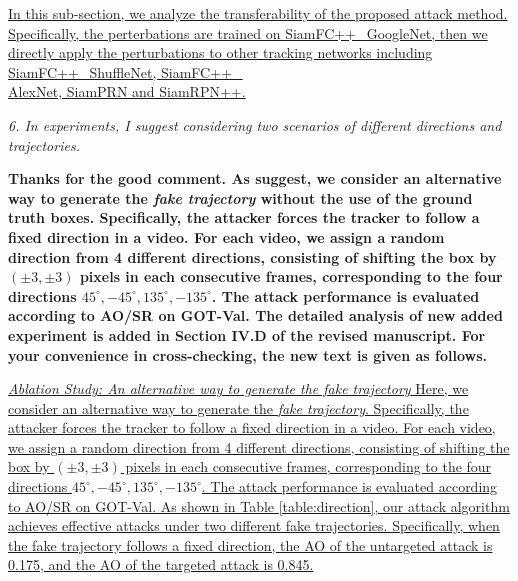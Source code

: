 \documentclass[12pt]{article}
\begin{document}
\uline{In this sub-section, we analyze the transferability of the proposed attack method. Specifically, the perterbations are trained on SiamFC++\_GoogleNet, then we directly apply the perturbations to other tracking networks including SiamFC++\_ShuffleNet, SiamFC++\_\\AlexNet, SiamPRN and SiamRPN++.}

\textit{6. In experiments, I suggest considering two scenarios of different directions and trajectories.}

\textbf{Thanks for the good comment. As suggest, we consider an alternative way to generate the \textit{fake trajectory} without the use of the ground truth boxes. Specifically, the attacker forces the tracker to follow a fixed direction in a video. For each video, we assign a random direction from 4 different directions, consisting of shifting the box by $(\pm 3, \pm 3)$ pixels in each consecutive frames, corresponding to the four directions $45^{\circ}, -45^{\circ}, 135^{\circ}, -135^{\circ}$.
The attack performance is evaluated according to AO/SR on GOT-Val.
The detailed analysis of new added experiment is added in Section IV.D of the revised manuscript. For your convenience in cross-checking, the new text is given as follows.}

\uline{\textit{Ablation Study: An alternative way to generate the fake trajectory} Here, we consider an alternative way to generate the \textit{fake trajectory}. Specifically, the attacker forces the tracker to follow a fixed direction in a video. For each video, we assign a random direction from 4 different directions, consisting of shifting the box by $(\pm 3, \pm 3)$ pixels in each consecutive frames, corresponding to the four directions $45^{\circ}, -45^{\circ}, 135^{\circ}, -135^{\circ}$.
The attack performance is evaluated according to AO/SR on GOT-Val.
As shown in Table \ref{table:direction}, our attack algorithm achieves effective attacks under two different fake trajectories. Specifically, when the fake trajectory follows a fixed direction, the AO of the untargeted attack is 0.175, and the AO of the targeted attack is 0.845.}
\end{document}
